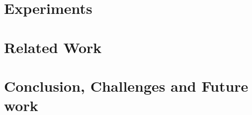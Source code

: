 \documentclass{article}
\newcommand\ignore[1]{}
\newcommand\comment[1]{\marginpar{\parbox{\marginparwidth}{\tiny #1}}}
\renewcommand\comment[1]{#1}
\newcommand{\todo}[1]{{\comment{\color{red}\textsc{TODO:}#1} }}
\begin{document}
\section{Experiments}
\label{sec:experiments}

%  

\section{Related Work}\label{sec:related}



\section{Conclusion, Challenges and Future work}\label{sec:conclusion}


\ignore{
\newpage
{\color{red}This should be page (at most) 7. Limit is 6 real pages, 1 page of references. Proofs go in appendix. If references are too long, I will shorten them. That is not an issue}
\newpage
}

{
    \fontsize{8}{6}

 
}
% 
\end{document}
